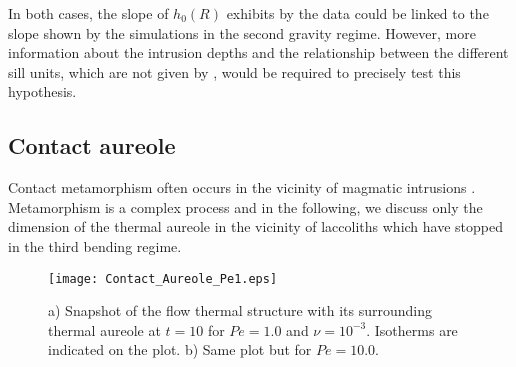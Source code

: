 In both  cases, the slope  of $h_0(R)$ exhibits  by the data  could be
linked to  the slope shown  by the  simulations in the  second gravity
regime. However,  more information about  the intrusion depths  and the
relationship between the different sill  units, which are not given by
\citet{Cruden:tg},   would  be   required  to   precisely  test   this
hypothesis.

\subsection{Contact aureole}
\label{C4-sec:thermal-aureol}

Contact  metamorphism  often  occurs   in  the  vicinity  of  magmatic
intrusions
\citep{Jaeger:1959du,SILLITOE:1998bs,Senger:2014tt}. Metamorphism is a
complex process and in the following, we discuss only the dimension of
the thermal aureole  in the vicinity of laccoliths  which have stopped
in the third bending regime.

\begin{figure}[h!]
  \begin{center}
    \graphicspath{ {/Users/thorey/Documents/These/Projet/Refroidissement/Skin_Model/Figure/Figure_Heating/} }
    \texttt{[image: Contact\_Aureole\_Pe1.eps]}
    \caption{a)  Snapshot  of  the  flow thermal  structure  with  its
      surrounding  thermal   aureole  at   $t=10$  for   $Pe=1.0$  and
      $\nu=10^{-3}$.  Isotherms  are indicated  on the plot.   b) Same
      plot but for $Pe=10.0$.}
    \label{Contact_Areuol2}
  \end{center}
\end{figure}

